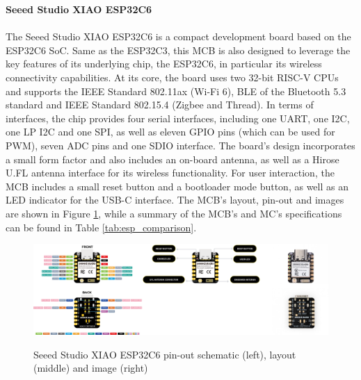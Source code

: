 \textbf{Seeed Studio XIAO ESP32C6}\\\\
The Seeed Studio XIAO ESP32C6 is a compact development board based on the ESP32C6 SoC. Same as the ESP32C3, this MCB is also designed to leverage the key features of its underlying chip, the ESP32C6, in particular its wireless connectivity capabilities. At its core, the board uses two 32-bit RISC-V CPUs and supports the IEEE Standard 802.11ax (Wi-Fi 6), BLE of the Bluetooth 5.3 standard and IEEE Standard 802.15.4 (Zigbee and Thread).
In terms of interfaces, the chip provides four serial interfaces, including one UART, one I2C, one LP I2C and one SPI, as well as eleven GPIO pins (which can be used for PWM), seven ADC pins and one SDIO interface. The board's design incorporates a small form factor and also includes an on-board antenna, as well as a Hirose U.FL antenna interface for its wireless functionality. For user interaction, the MCB includes a small reset button and a bootloader mode button, as well as an LED indicator for the USB-C interface. The MCB's layout, pin-out and images are shown in Figure \ref{fig:esp32c6}, while a summary of the MCB's and MC's specifications can be found in Table \ref{tab:esp_comparison}.  \citep{espressif_systems_esp32-c6_2024, seeed_studio_seeed_2024-1}
\begin{figure}[H]
    \centering
    \includegraphics[width=\textwidth]{overleaf/images/xiaoesp32c6.png}
    \\\vspace{\ftspace}
    \caption{Seeed Studio XIAO ESP32C6 pin-out schematic (left), layout (middle) and image (right) \citep[adapted from][]{seeed_studio_seeed_2024-1}}
    \label{fig:esp32c6}
\end{figure}

